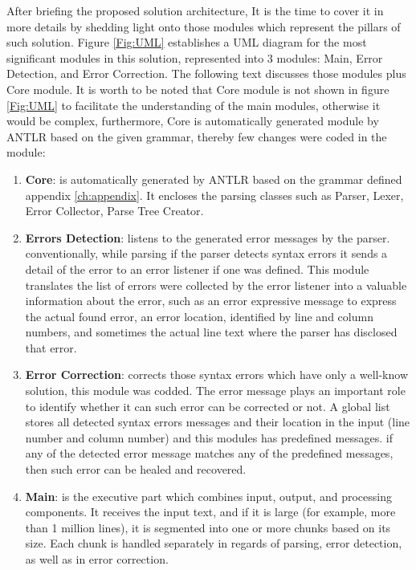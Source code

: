 After briefing the proposed solution architecture, It is the time to cover it in more details by shedding light onto those modules which represent the pillars of such solution. {Figure \ref{Fig:UML}} establishes a UML diagram for the most significant modules in this solution, represented into 3 modules: Main, Error Detection, and Error Correction. The following text discusses those modules plus Core module. It is worth to be noted that Core module is not shown in {figure \ref{Fig:UML}} to facilitate the understanding of the main modules, otherwise it would be complex, furthermore, Core is automatically generated module by ANTLR based on the given grammar, thereby few changes were coded in the module:  
 \begin{enumerate}[]
 \item \textbf {Core}: is automatically generated by ANTLR based on the grammar defined appendix \ref{ch:appendix}. It encloses the parsing classes such as Parser, Lexer, Error Collector, Parse Tree Creator.   
\item \textbf{Errors Detection}: listens to the generated error messages by the parser. conventionally, while parsing if the parser detects syntax errors it sends a detail of the error to an error listener if one was defined. This module translates the list of errors were collected by the error listener into a valuable information about the error, such as an error expressive message to express the actual found error, an error location, identified by line and column numbers, and sometimes the actual line text where the parser has disclosed that error.
\item \textbf {Error Correction}: corrects those syntax errors which have only a well-know solution, this module was codded. The error message plays an important role to identify whether it can such error can be corrected or not. A global list stores all detected syntax errors messages and their location in the input (line number and column number) and this modules has predefined messages. if any of the detected error message matches any of the predefined messages, then such error can be healed and recovered.
\item \textbf{Main}: is the executive part which combines input, output, and processing components. It receives the input text, and if it is large (for example, more than 1 million lines), it is segmented into one or more chunks based on its size. Each chunk is handled separately in regards of parsing, error detection, as well as in error correction.

\end{enumerate} 

